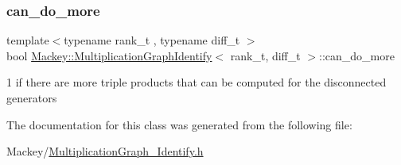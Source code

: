 \subsubsection{\texorpdfstring{can\+\_\+do\+\_\+more}{can\_do\_more}}
{\footnotesize\ttfamily template$<$typename rank\+\_\+t , typename diff\+\_\+t $>$ \\
bool \hyperlink{classMackey_1_1MultiplicationGraphIdentify}{Mackey\+::\+Multiplication\+Graph\+Identify}$<$ rank\+\_\+t, diff\+\_\+t $>$\+::can\+\_\+do\+\_\+more\hspace{0.3cm}{\ttfamily [protected]}}



1 if there are more triple products that can be computed for the disconnected generators 



The documentation for this class was generated from the following file\+:\begin{DoxyCompactItemize}
\item 
Mackey/\hyperlink{MultiplicationGraph__Identify_8h}{Multiplication\+Graph\+\_\+\+Identify.\+h}\end{DoxyCompactItemize}
